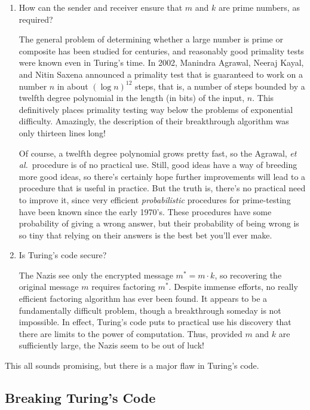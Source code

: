 \begin{enumerate}

\item How can the sender and receiver ensure that $m$ and $k$ are
prime numbers, as required?

The general problem of determining whether a large number is prime or
composite has been studied for centuries, and reasonably good primality
tests were known even in Turing's time.  In 2002, Manindra Agrawal, Neeraj
Kayal, and Nitin Saxena announced a primality test that is guaranteed to
work on a number $n$ in about $(\log n)^{12}$ steps, that is, a number of
steps bounded by a twelfth degree polynomial in the length (in bits) of
the input, $n$.  This definitively places primality testing way below the
problems of exponential difficulty.  Amazingly, the description of their
breakthrough algorithm was only thirteen lines long!

Of course, a twelfth degree polynomial grows pretty fast, so the
Agrawal,\emph{ et al.}\ procedure is of no practical use.  Still, good
ideas have a way of breeding more good ideas, so there's certainly
hope further improvements will lead to a procedure that is useful in
practice.  But the truth is, there's no practical need to improve it,
since very efficient \emph{probabilistic} procedures for prime-testing
have been known since the early 1970's.  These procedures have some
probability of giving a wrong answer, but their probability of being
wrong is so tiny that relying on their answers is the best bet you'll
ever make.

\item Is Turing's code secure?

The Nazis see only the encrypted message $m^* = m \cdot k$, so
recovering the original message $m$ requires factoring $m^*$.  Despite
immense efforts, no really efficient factoring algorithm has ever been
found.  It appears to be a fundamentally difficult problem, though a
breakthrough someday is not impossible.  In effect, Turing's code puts
to practical use his discovery that there are limits to the power of
computation.  Thus, provided $m$ and $k$ are sufficiently large, the
Nazis seem to be out of luck!

\end{enumerate}

This all sounds promising, but there is a major flaw in Turing's code.

\subsection{Breaking Turing's Code}

